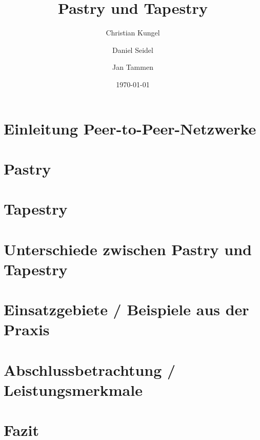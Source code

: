 \documentclass[
	a4paper,     		%
	headsepline, 		%
	footsepline, 		%
	titlepage,   		%
	12pt,        		%
]{scrreprt}
\title{Pastry und Tapestry}
\author{%
	Christian Kungel
	\and{%
		Daniel Seidel
	}%
	\and{%
		Jan Tammen
	}%
}%
\date{\today}
\begin{document}
\maketitle

\thispagestyle{empty}


\tableofcontents

\newpage
\listoffigures


\chapter{Einleitung Peer-to-Peer-Netzwerke}


\chapter{Pastry}


\chapter{Tapestry}


\chapter{Unterschiede zwischen Pastry und Tapestry}


\chapter{Einsatzgebiete / Beispiele aus der Praxis}


\chapter{Abschlussbetrachtung / Leistungsmerkmale}


\chapter{Fazit}








\renewcommand{\bibname}{Quellen}



\end{document}
